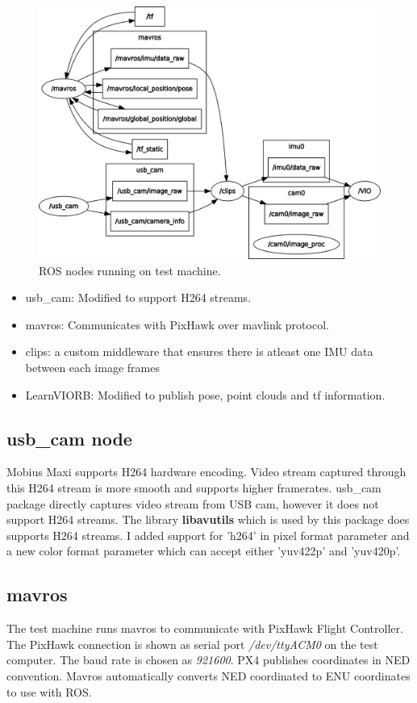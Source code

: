 \begin{figure} \label{fig:rosgraph}
	\centering
	\includegraphics[width=5in]{figures/rosgraph}
	\caption[ROS node tunning on test machine]{\small 
		ROS nodes running on test machine. }
	\label{fig:rig}
\end{figure}

\begin{itemize}
	\item usb\_cam: Modified to support H264 streams.
	\item mavros: Communicates with PixHawk over mavlink protocol.
	\item clips: a custom middleware that ensures there is atleast one IMU data between each image frames
	\item LearnVIORB: Modified to publish pose, point clouds and tf information.
\end{itemize}

\subsection{usb\_cam node}
Mobius Maxi supports H264 hardware encoding. Video stream captured through this H264 stream is more smooth and supports higher framerates. usb\_cam package directly captures video stream from USB cam, however it does not support H264 streams.
The library \textbf{libavutils} which is used by this package does supports H264 streams. I added support for 'h264' in pixel format parameter and a new color format parameter which can accept either 'yuv422p' and 'yuv420p'.
 
\subsection{mavros}
The test machine runs mavros to communicate with PixHawk Flight Controller. 
The PixHawk connection is shown as serial port \textit{/dev/ttyACM0} on the test computer. The baud rate is chosen as \textit{921600}.
PX4 publishes coordinates in NED convention. Mavros automatically converts NED coordinated to ENU coordinates to use with ROS.

